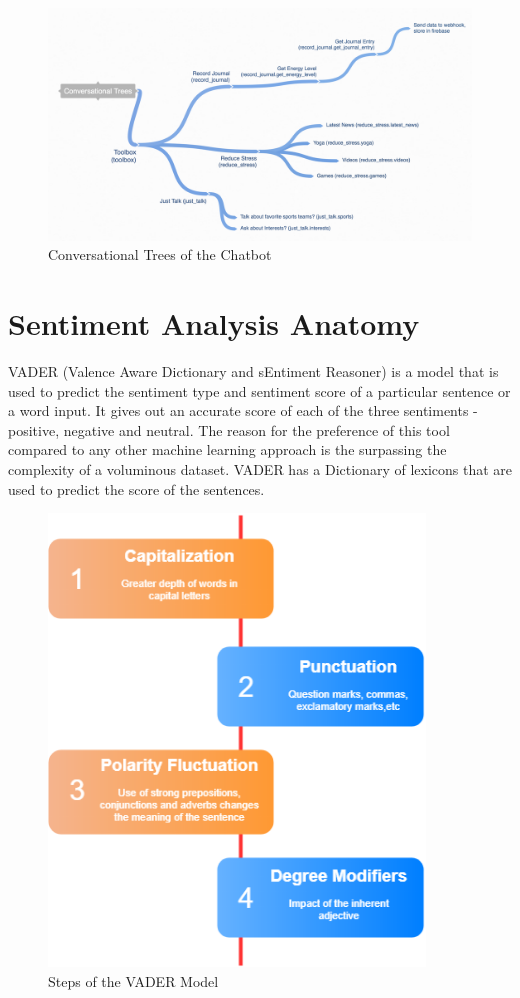 \begin{figure}[H]
    \centering
    \includegraphics[width=\linewidth]{images/conversational-trees.png}
    \caption{Conversational Trees of the Chatbot}
    \label{fig:conversational-trees}
\end{figure}

\pagebreak

\section{Sentiment Analysis Anatomy}

VADER (Valence Aware Dictionary and sEntiment Reasoner) is a model that is used to predict the sentiment type and sentiment score of a particular sentence or a word input. It gives out an accurate score of each of the three sentiments - positive, negative and neutral. The reason for the preference of this tool compared to any other machine learning approach is the surpassing the complexity of a voluminous dataset. VADER has a Dictionary of lexicons that are used to predict the score of the sentences.

\begin{figure}[H]
    \centering
    \includegraphics[width=10cm]{images/vader-model.png}
    \caption{Steps of the VADER Model}
    \label{fig:vader-model}
\end{figure}

